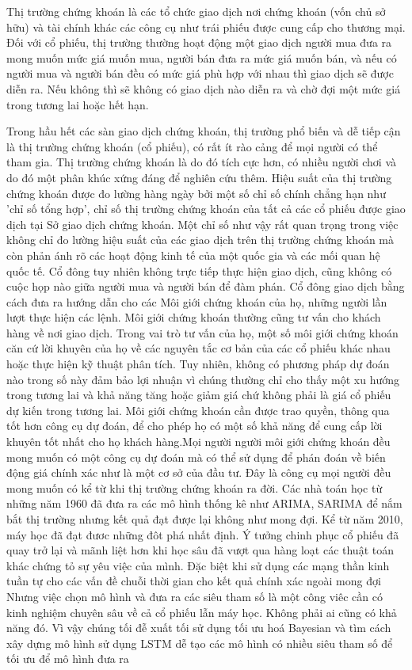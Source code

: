 Thị trường chứng khoán là các tổ chức giao dịch nơi chứng khoán (vốn chủ sở hữu) và tài chính khác
các công cụ như trái phiếu được cung cấp cho thương mại. Đối với cổ phiếu, thị trường thường hoạt động
một giao dịch người mua đưa ra mong muốn mức giá muốn mua, người bán đưa ra mức giá muốn bán, và nếu có người mua và người bán đều có mức giá phù hợp với nhau thì giao dịch sẽ được diễn ra. Nếu không thì sẽ không có giao dịch nào diễn ra và chờ đợi một mức giá  trong tương lai hoặc hết hạn.

Trong hầu hết các sàn giao dịch chứng khoán, thị trường phổ biến và dễ tiếp cận là thị trường chứng khoán
(cổ phiếu), có rất ít rào cảng để mọi người có thể tham gia. Thị trường chứng khoán là
do đó tích cực hơn, có nhiều người chơi và do đó một phân khúc xứng đáng để nghiên cứu thêm.
Hiệu suất của thị trường chứng khoán được đo lường hàng ngày bởi một số chỉ số chính
chẳng hạn như 'chỉ số tổng hợp', chỉ số thị trường chứng khoán của tất cả các cổ phiếu được giao dịch tại Sở giao dịch chứng khoán. Một chỉ số như vậy rất quan trọng trong việc không chỉ đo lường
hiệu suất của các giao dịch trên thị trường chứng khoán mà còn phản ánh rõ các hoạt động kinh tế của một quốc gia và các mối quan hệ quốc tế. Cổ đông tuy nhiên không trực tiếp thực hiện giao dịch,
cũng không có cuộc họp nào giữa người mua và người bán để đàm phán. Cổ đông giao dịch
bằng cách đưa ra hướng dẫn cho các Môi giới chứng khoán của họ, những người lần lượt thực hiện các lệnh. Môi giới chứng khoán
thường cũng tư vấn cho khách hàng về nơi giao dịch. Trong vai trò tư vấn của họ, một số môi giới chứng khoán
căn cứ lời khuyên của họ về các nguyên tắc cơ bản của các cổ phiếu khác nhau hoặc thực hiện kỹ thuật
phân tích. Tuy nhiên, không có phương pháp dự đoán nào trong số này đảm bảo lợi nhuận vì chúng
thường chỉ cho thấy một xu hướng trong tương lai và khả năng tăng hoặc giảm giá chứ không phải là
giá cổ phiếu dự kiến ​​trong tương lai. Môi giới chứng khoán cần được trao quyền, thông qua tốt hơn
công cụ dự đoán, để cho phép họ có một số khả năng để cung cấp lời khuyên tốt nhất cho họ
khách hàng.Mọi người người môi giới chứng khoán đều mong muốn có một công cụ dự đoán mà có thể sử dụng để phán đoán về biến động giá chính xác như là một cơ sở của đầu tư. 
Đây là công cụ mọi người đều mong muốn có kể từ khi thị trường chứng khoán ra đời. Các nhà toán học từ những năm 1960 đã đưa ra các mô hình thống kê như ARIMA, SARIMA để nắm bắt thị trường nhưng kết quả đạt được lại không như mong đợi.
Kể từ năm 2010, máy học đã đạt đươc những đôt phá nhất định. Ý tưởng chinh phục cổ phiếu đã quay trở lại và mãnh liệt hơn khi học sâu đã vượt qua hàng loạt các thuật toán khác chứng tỏ sự yêu việc của mình. Đặc biệt khi sử dụng các mạng thần kinh tuần tự cho các vấn đề chuỗi thời gian cho kết quả chính xác ngoài mong đợi
Nhưng việc chọn mô hình và đưa ra các siêu tham số là một công viêc cần có kinh nghiệm chuyên sâu về cả cổ phiếu lẫn máy học. 
Không phải ai cũng có khả năng đó. Vì vậy chúng tối đễ xuất tối sử dụng tối ưu hoá Bayesian và tìm cách xây dựng mô hình sử dụng LSTM dễ tạo các mô hình có nhiều siêu tham số để tối ưu để mô hình đưa ra
